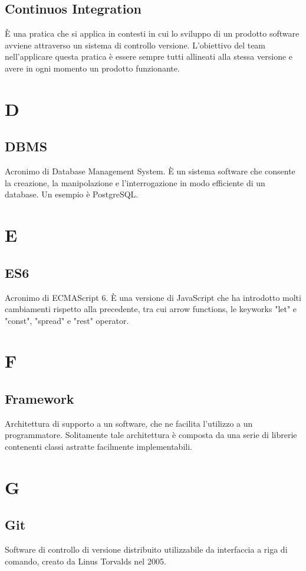 \subsection*{Continuos Integration}
È una pratica che si applica in contesti in cui lo sviluppo di un prodotto software avviene attraverso un sistema di controllo versione. L'obiettivo del team nell'applicare questa pratica è essere sempre tutti allineati alla stessa versione e avere in ogni momento un prodotto funzionante. 

\section*{D}
\subsection*{DBMS}
Acronimo di Database Management System. È un sistema software che consente la creazione, la manipolazione e l'interrogazione in modo efficiente di un database. Un esempio è PostgreSQL.

\section*{E}
\subsection*{ES6}
Acronimo di ECMAScript 6. È una versione di JavaScript che ha introdotto molti cambiamenti rispetto alla precedente, tra cui arrow functions, le keyworks "let" e "const", "spread" e "rest" operator.  
\section*{F}
\subsection*{Framework}
Architettura di supporto a un software, che ne facilita l'utilizzo a un programmatore. Solitamente tale architettura è composta da una serie di librerie contenenti classi astratte facilmente implementabili.

\section*{G}
\subsection*{Git}
Software di controllo di versione distribuito utilizzabile da interfaccia a riga di comando, creato da Linus Torvalds nel 2005. 

